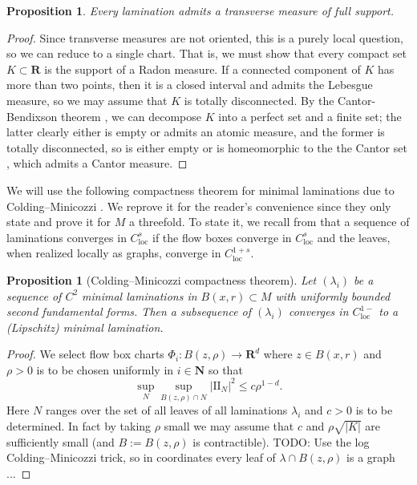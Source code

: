 \documentclass[reqno,10pt]{amsart}
\newcommand{\NN}{\mathbf{N}}
\newcommand{\RR}{\mathbf{R}}
\newcommand{\Two}{\mathrm{I\!I}}
\newcommand{\loc}{\mathrm{loc}}
\newtheorem{proposition}[theorem]{Proposition}
\theoremstyle{definition}
\numberwithin{equation}{section}
\begin{document}
\begin{proposition}
Every lamination admits a transverse measure of full support.
\end{proposition}
\begin{proof}
Since transverse measures are not oriented, this is a purely local question, so we can reduce to a single chart.
That is, we must show that every compact set $K \subset \RR$ is the support of a Radon measure.
If a connected component of $K$ has more than two points, then it is a closed interval and admits the Lebesgue measure, so we may assume that $K$ is totally disconnected.
By the Cantor-Bendixson theorem \cite[Theorem 6.4]{kechris2012classical}, we can decompose $K$ into a perfect set and a finite set; the latter clearly either is empty or admits an atomic measure, and the former is totally disconnected, so is either empty or is homeomorphic to the the Cantor set \cite[Chapter 2]{Pugh02}, which admits a Cantor measure.
\end{proof}

We will use the following compactness theorem for minimal laminations due to Colding--Minicozzi \cite[Proposition B.1]{ColdingMinicozziIV}.
We reprove it for the reader's convenience since they only state and prove it for $M$ a threefold.
To state it, we recall from \cite{ColdingMinicozziIV} that a sequence of laminations converges in $C^s_\loc$ if the flow boxes converge in $C^s_\loc$ and the leaves, when realized locally as graphs, converge in $C^{1 + s}_\loc$.

\begin{proposition}[Colding--Minicozzi compactness theorem]
Let $(\lambda_i)$ be a sequence of $C^2$ minimal laminations in $B(x, r) \subset M$ with uniformly bounded second fundamental forms. 
Then a subsequence of $(\lambda_i)$ converges in $C^{1-}_\loc$ to a (Lipschitz) minimal lamination.
\end{proposition}
\begin{proof}
We select flow box charts $\Phi_i: B(z, \rho) \to \RR^d$ where $z \in B(x, r)$ and $\rho > 0$ is to be chosen uniformly in $i \in \NN$ so that 
$$\sup_N \sup_{B(z, \rho) \cap N} |\Two_N|^2 \leq c\rho^{1 - d}.$$
Here $N$ ranges over the set of all leaves of all laminations $\lambda_i$ and $c > 0$ is to be determined.
In fact by taking $\rho$ small we may assume that $c$ and $\rho\sqrt{|K|}$ are sufficiently small (and $B := B(z, \rho)$ is contractible).
TODO: Use the log Colding--Minicozzi trick, so in coordinates every leaf of $\lambda \cap B(z, \rho)$ is a graph ...
\end{proof}
\end{document}
